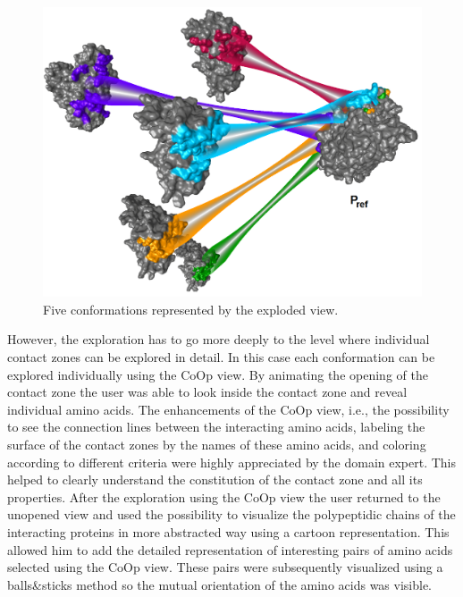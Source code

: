 \documentclass[journal]{vgtc}                %
\begin{document}
\begin{figure}[bt]
  \centering
  \includegraphics[width=1.0\columnwidth]{case2.png}
  \caption{Five conformations represented by the exploded view.}
  \label{fig:case2}
\end{figure}

However, the exploration has to go more deeply to the level where individual contact zones can be explored in detail.
In this case each conformation can be explored individually using the CoOp view.
By animating the opening of the contact zone the user was able to look inside the contact zone and reveal individual amino acids.
The enhancements of the CoOp view, i.e., the possibility to see the connection lines between the interacting amino acids, labeling the surface of the contact zones by the names of these amino acids, and coloring according to different criteria were highly appreciated by the domain expert.
This helped to clearly understand the constitution of the contact zone and all its properties.
After the exploration using the CoOp view the user returned to the unopened view and used the possibility to visualize the polypeptidic chains of the interacting proteins in more abstracted way using a cartoon representation. 
This allowed him to add the detailed representation of interesting pairs of amino acids selected using the CoOp view.
These pairs were subsequently visualized using a balls\&sticks method so the mutual orientation of the amino acids was visible.

\end{document}
